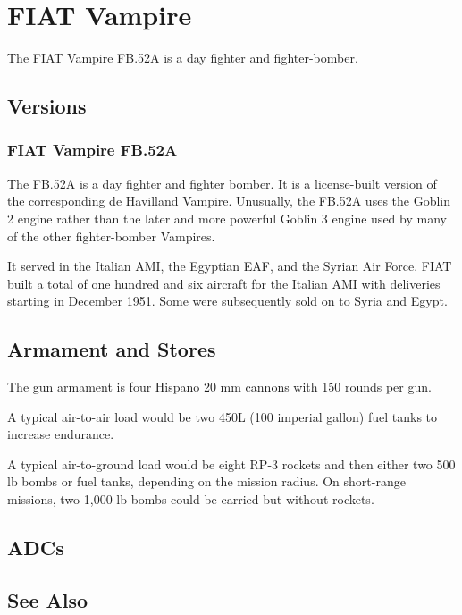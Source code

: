 \section{FIAT Vampire}

The FIAT Vampire FB.52A is a day fighter and fighter-bomber. 

\subsection{Versions}

\subsubsection{FIAT Vampire FB.52A}

The FB.52A is a day fighter and fighter bomber. It is a license-built version of the corresponding de Havilland Vampire. Unusually, the FB.52A uses the Goblin 2 engine rather than the later and more powerful Goblin 3 engine used by many of the other fighter-bomber Vampires. 

It served in the Italian AMI, the Egyptian EAF, and the Syrian Air Force. FIAT built a total of one hundred and six aircraft for the Italian AMI with deliveries starting in December 1951. Some were subsequently sold on to Syria and Egypt.

\subsection{Armament and Stores}

The gun armament is four Hispano 20 mm cannons with 150 rounds per gun. 

A typical air-to-air load would be two 450L (100 imperial gallon) fuel tanks to increase endurance. 

A typical air-to-ground load would be eight RP-3 rockets and then either two 500 lb bombs or fuel tanks, depending on the mission radius. On short-range missions, two 1,000-lb bombs could be carried but without rockets.

\subsection{ADCs}

\begin{adclist}
\end{adclist}

\subsection{See Also}

\begin{typelist}
\end{typelist}
